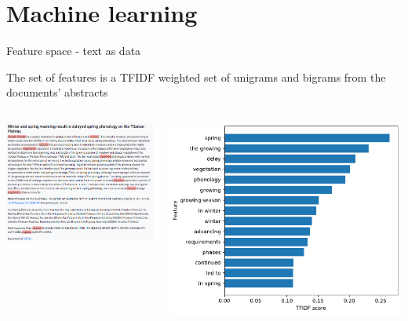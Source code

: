 \documentclass[9pt]{beamer}
\begin{document}
\section{Machine learning}

\begin{frame}{Feature space - text as data}

The set of features is a TFIDF weighted set of unigrams and bigrams from the documents' abstracts

\medskip

\begin{columns}
	\begin{column}{0.5\linewidth}
		\includegraphics[width=\linewidth]{images/doc_example.png}
	\end{column}
	\begin{column}{0.5\linewidth}
		\includegraphics[width=\linewidth]{images/example_doc_tfidf.pdf}
	\end{column}
\end{columns}


\end{frame}
\end{document}
